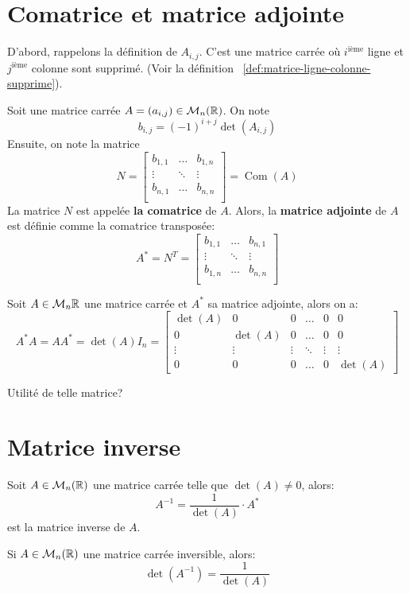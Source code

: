 \section{Comatrice et matrice adjointe}
D'abord, rappelons la définition de $A_{i,j}$. C'est une matrice carrée où $i^{\text{ième}}$ ligne et $j^{\text{ième}}$ colonne sont supprimé. (Voir la définition ~\ref{def:matrice-ligne-colonne-supprime}).
\begin{definition}
    Soit une matrice carrée $A = (a_{i, j}) \in \mathcal{M}_n(\mathbb{R})$. On note
    \[
        b_{i, j} = (-1)^{i + j}\det(A_{i, j})
    \] 
    Ensuite, on note la matrice
    \[
        N = 
        \begin{bmatrix} 
            b_{1,1} & \ldots & b_{1, n}\\
            \vdots  & \ddots & \vdots  \\
            b_{n,1} & \ldots & b_{n, n}\\
        \end{bmatrix} 
        = \operatorname{Com}(A)
    \] 
    La matrice $N$ est appelée \textbf{la comatrice} de $A$.
    Alors, la \textbf{matrice adjointe} de $A$ est définie comme la comatrice transposée:
    \[
        A^{*} = N^{T} = 
        \begin{bmatrix} 
            b_{1,1} & \ldots & b_{n, 1}\\
            \vdots  & \ddots & \vdots  \\
            b_{1,n} & \ldots & b_{n, n}\\
        \end{bmatrix} 
    \] 
\end{definition}

\begin{theorem}
    Soit $A \in \mathcal{M}_n{\mathbb{R}}$ une matrice carrée et $A^{*}$ sa matrice adjointe, alors on a:
     \[
         A^{*}A = A A^{*} = \det(A)I_n = 
         \begin{bmatrix}  
             \det(A) & 0        & 0      & \ldots & 0 & 0\\
             0       & \det(A)  & 0      & \ldots & 0 & 0\\
             \vdots  & \vdots   & \vdots & \ddots & \vdots & \vdots\\
             0       & 0        & 0      & \ldots & 0      & \det(A)
         \end{bmatrix}  
    \] 
\end{theorem}
Utilité de telle matrice?
\section{Matrice inverse}
\begin{theorem}
    Soit $A \in \mathcal{M}_n(\mathbb{R})$ une matrice carrée telle que $\det(A) \neq 0$, alors:
    \[
        A^{-1} = \frac{1}{\det(A)}\cdot A^{*}
    \] 
    est la matrice inverse de $A$.
\end{theorem}
\begin{corollary}
   Si $A \in \mathcal{M}_n(\mathbb{R})$ une matrice carrée inversible, alors:
   \[
       \det(A^{-1}) = \frac{1}{\det(A)}
   \] 
\end{corollary}
